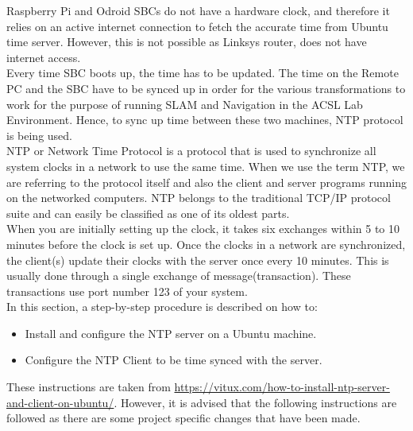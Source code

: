\documentclass[12]{article}
\begin{document}
Raspberry Pi and Odroid SBCs do not have a hardware clock, and therefore it relies on an active internet connection to fetch the accurate time from Ubuntu time server. However, this is not possible as Linksys router, does not have internet access.\\
Every time SBC boots up, the time has to be updated. The time on the Remote PC and the SBC have to be synced up in order for the various transformations to work for the purpose of running SLAM and Navigation in the ACSL Lab Environment. Hence, to sync up time between these two machines, NTP protocol is being used.\\
NTP or Network Time Protocol is a protocol that is used to synchronize all system clocks in a network to use the same time. When we use the term NTP, we are referring to the protocol itself and also the client and server programs running on the networked computers. NTP belongs to the traditional TCP/IP protocol suite and can easily be classified as one of its oldest parts.\\
When you are initially setting up the clock, it takes six exchanges within 5 to 10 minutes before the clock is set up. Once the clocks in a network are synchronized, the client(s) update their clocks with the server once every 10 minutes. This is usually done through a single exchange of message(transaction). These transactions use port number 123 of your system.\\
In this section, a step-by-step procedure is described on how to:
\begin{itemize}
	\item{Install and configure the NTP server on a Ubuntu machine.}
	\item{Configure the NTP Client to be time synced with the server.}
\end{itemize}
These instructions are taken from \url{https://vitux.com/how-to-install-ntp-server-and-client-on-ubuntu/}. However, it is advised that the following instructions are followed as there are some project specific changes that have been made.
\end{document}
